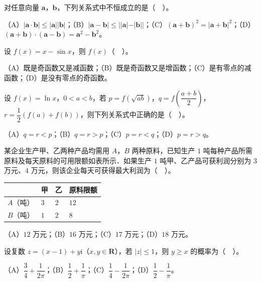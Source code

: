\begin{question}
对任意向量 $\boldsymbol{a}$，$\boldsymbol{b}$，下列关系式中不恒成立的是（　）。

（A）$|\boldsymbol{a}\cdot\boldsymbol{b}|\le|\boldsymbol{a}||\boldsymbol{b}|$；（B）$|\boldsymbol{a}-\boldsymbol{b}|\le||\boldsymbol{a}|-|\boldsymbol{b}||$；（C）$(\boldsymbol{a}+\boldsymbol{b})^{2}=|\boldsymbol{a}+\boldsymbol{b}|^{2}$；（D）$(\boldsymbol{a}+\boldsymbol{b})\cdot(\boldsymbol{a}-\boldsymbol{b})=\boldsymbol{a}^{2}-\boldsymbol{b}^{2}$。

\end{question}
\begin{question}
设 $f(x)=x-\sin x$，则 $f(x)$（　）。

（A）既是奇函数又是减函数；（B）既是奇函数又是增函数；（C）是有零点的减函数；（D）是没有零点的奇函数。

\end{question}
\begin{question}
设 $f(x)=\ln x$，$0<a<b$，若 $p=f\left(\sqrt{ab}\right)$，$q=f\left(\dfrac{a+b}{2}\right)$，$r=\dfrac{1}{2}(f(a)+f(b))$，则下列关系式中正确的是（　）。

（A）$q=r<p$；（B）$q=r>p$；（C）$p=r<q$；（D）$p=r>q$。

\end{question}
\begin{question}
某企业生产甲、乙两种产品均需用 $A$，$B$ 两种原料，已知生产 $1$ 吨每种产品所需原料及每天原料的可用限额如表所示．如果生产 $1$ 吨甲、乙产品可获利润分别为 $3$ 万元、$4$ 万元，则该企业每天可获得最大利润为（　）。

\begin{center}
\begin{tabular}{llll}
\toprule
 & 甲 & 乙 & 原料限额 \\
\midrule
$A$（吨） & $3$ & $2$ & $12$ \\
$B$（吨） & $1$ & $2$ & $8$ \\
\bottomrule
\end{tabular}
\end{center}

（A）$12$ 万元；（B）$16$ 万元；（C）$17$ 万元；（D）$18$ 万元。

\end{question}
\begin{question}
设复数 $z=(x-1)+y\mathrm{i}$（$x,y\in\mathbf{R}$），若 $|z|\le 1$，则 $y\ge x$ 的概率为（　）。

（A）$\dfrac{3}{4}+\dfrac{1}{2\pi}$；（B）$\dfrac{1}{2}+\dfrac{1}{\pi}$；（C）$\dfrac{1}{4}-\dfrac{1}{2\pi}$；（D）$\dfrac{1}{2}-\dfrac{1}{\pi}$。

\end{question}

